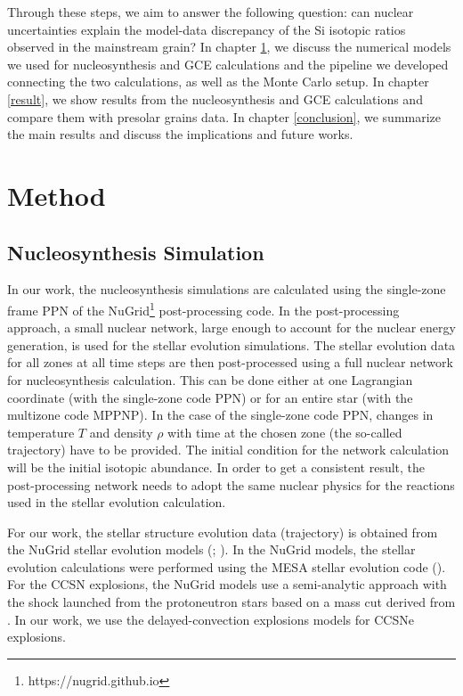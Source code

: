 \documentclass{brandeis-thesis3.2}
\begin{document}
Through these steps, we aim to answer the following question: can nuclear uncertainties explain the model-data discrepancy of the Si isotopic ratios observed in the mainstream grain? In chapter \ref{method}, we discuss the numerical models we used for nucleosynthesis and GCE calculations and the pipeline we developed connecting the two calculations, as well as the Monte Carlo setup. In chapter \ref{result}, we show results from the nucleosynthesis and GCE calculations and compare them with presolar grains data. In chapter \ref{conclusion}, we summarize the main results and discuss the implications and future works.



\chapter{Method} \label{method}


\section{Nucleosynthesis Simulation} \label{nucleosynthesis}
In our work, the nucleosynthesis simulations are calculated using the single-zone frame PPN of the NuGrid\footnote{https://nugrid.github.io} post-processing code. In the post-processing approach, a small nuclear network, large enough to account for the nuclear energy generation, is used for the stellar evolution simulations. The stellar evolution data for all zones at all time steps are then post-processed using a full nuclear network for nucleosynthesis calculation. This can be done either at one Lagrangian coordinate (with the single-zone code PPN) or for an entire star (with the multizone code MPPNP). In the case of the single-zone code PPN, changes in temperature $T$ and density $\rho$ with time at the chosen zone (the so-called trajectory) have to be provided. The initial condition for the network calculation will be the initial isotopic abundance. In order to get a consistent result, the post-processing network needs to adopt the same nuclear physics for the reactions used in the stellar evolution calculation. 

For our work, the stellar structure evolution data (trajectory) is obtained from the NuGrid stellar evolution models (\citealt{Pignatari_2016}; \citealt{Ritter_2018}). In the NuGrid models, the stellar evolution calculations were performed using the MESA stellar evolution code (\citealt{Paxton_2011}). For the CCSN explosions, the NuGrid models use a semi-analytic approach with the shock launched from the protoneutron stars based on a mass cut derived from \cite{Fryer_2012}. In our work, we use the delayed-convection explosions models for CCSNe explosions. 
\end{document}
